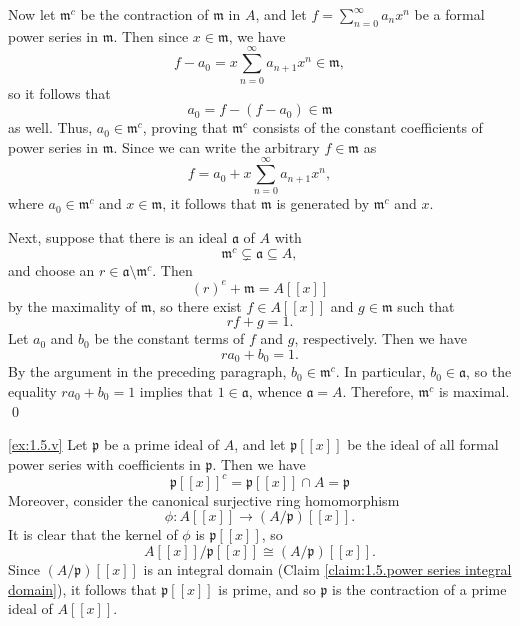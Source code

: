 Now let $\mathfrak m^c$ be the contraction of $\mathfrak m$ in $A$, and let $f = \sum_{n=0}^\infty a_n x^n$ be a formal power series in $\mathfrak m$.
Then since $x\in\mathfrak m$, we have
\begin{equation*}
f - a_0 = x\sum_{n=0}^\infty a_{n+1} x^n \in \mathfrak m,
\end{equation*}
so it follows that
\begin{equation*}
a_0 = f - (f - a_0) \in \mathfrak m
\end{equation*}
as well.
Thus, $a_0 \in \mathfrak m^c$, proving that $\mathfrak m^c$ consists of the constant coefficients of power series in $\mathfrak m$.
Since we can write the arbitrary $f \in \mathfrak m$ as
\begin{equation*}
f = a_0 + x\sum_{n=0}^\infty a_{n+1} x^n,
\end{equation*}
where $a_0 \in \mathfrak m^c$ and $x \in \mathfrak m$, it follows that $\mathfrak m$ is generated by $\mathfrak m^c$ and $x$.

Next, suppose that there is an ideal $\mathfrak a$ of $A$ with
\begin{equation*}
\mathfrak m^c \subsetneq \mathfrak a \subseteq A,
\end{equation*}
and choose an $r \in \mathfrak a \setminus \mathfrak m^c$.
Then
\begin{equation*}
(r)^e + \mathfrak m = A[[x]]
\end{equation*}
by the maximality of $\mathfrak m$, so there exist $f \in A[[x]]$ and $g \in \mathfrak m$ such that 
\begin{equation*}
r f + g = 1.
\end{equation*}
Let $a_0$ and $b_0$ be the constant terms of $f$ and $g$, respectively.
Then we have
\begin{equation*}
r a_0 + b_0 = 1.
\end{equation*}
By the argument in the preceding paragraph, $b_0 \in \mathfrak m^c$.
In particular, $b_0 \in \mathfrak a$, so the equality $r a_0 + b_0 = 1$ implies that $1 \in \mathfrak a$, whence $\mathfrak a = A$.
Therefore, $\mathfrak m^c$ is maximal.
\qed

\noindent
\ref{ex:1.5.v}
Let $\mathfrak p$ be a prime ideal of $A$, and let $\mathfrak p[[x]]$ be  the ideal of all formal power series with coefficients in $\mathfrak p$.
Then we have
\begin{equation*}
\mathfrak p[[x]]^c
= \mathfrak p[[x]] \cap A
= \mathfrak p
\end{equation*}
Moreover, consider the canonical surjective ring homomorphism
\begin{equation*}
\phi : A[[x]] \to (A/\mathfrak p)[[x]].
\end{equation*}
It is clear that the kernel of $\phi$ is $\mathfrak p[[x]]$, so
\begin{equation*}
A[[x]] / \mathfrak p[[x]] \cong (A/\mathfrak p)[[x]].
\end{equation*}
Since $(A/\mathfrak p)[[x]]$ is an integral domain (Claim \ref{claim:1.5.power series integral domain}), it follows that $\mathfrak p[[x]]$ is prime, and so $\mathfrak p$ is the contraction of a prime ideal of $A[[x]]$.


